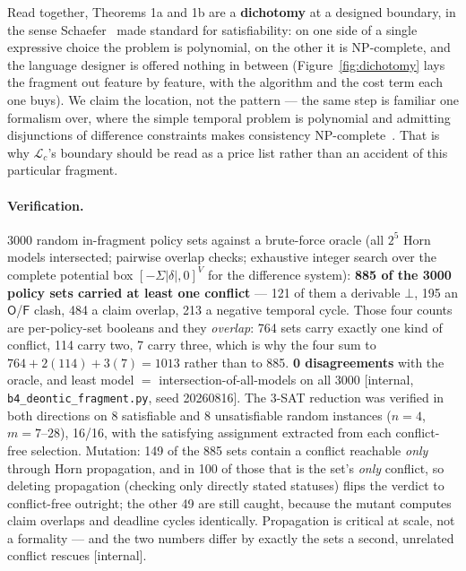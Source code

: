 \documentclass[11pt,a4paper]{article}
\newcommand{\Ob}{\mathsf{O}}
\newcommand{\Fb}{\mathsf{F}}
\begin{document}


Read together, Theorems 1a and 1b are a \textbf{dichotomy} at a designed boundary, in the sense Schaefer~\cite{schaefer78}
made standard for satisfiability: on one side of a single expressive choice the problem is polynomial, on the other it is
NP-complete, and the language designer is offered nothing in between (Figure~\ref{fig:dichotomy} lays the fragment out feature by
feature, with the algorithm and the cost term each one buys). We claim the location, not the pattern --- the same
step is familiar one formalism over, where the simple temporal problem is polynomial and admitting disjunctions of
difference constraints makes consistency NP-complete~\cite{dmp91,sk00}. That is why $\mathcal{L}_c$'s boundary should be read as a
price list rather than an accident of this particular fragment.

\paragraph{Verification.} 3000 random in-fragment policy sets against a brute-force oracle (all $2^5$ Horn models intersected;
pairwise overlap checks; exhaustive integer search over the complete potential box $[-\Sigma|\delta|,0]^V$ for the difference
system): \textbf{885 of the 3000 policy sets carried at least one conflict} --- 121 of them a derivable $\bot$, 195 an
$\Ob$/$\Fb$ clash, 484 a claim overlap, 213 a negative temporal cycle. Those four counts are per-policy-set booleans and they
\emph{overlap}: 764 sets carry exactly one kind of conflict, 114 carry two, 7 carry three, which is why the four sum to
$764+2(114)+3(7)=1013$ rather than to 885. \textbf{0 disagreements} with the oracle, and least model $=$
intersection-of-all-models on all 3000 [internal, \texttt{b4\_deontic\_fragment.py}, seed 20260816]. The 3-SAT reduction was
verified in both directions on 8 satisfiable and 8 unsatisfiable random instances ($n{=}4$, $m{=}7$--$28$), 16/16, with the
satisfying assignment extracted from each conflict-free selection. Mutation: 149 of the 885 sets contain a conflict reachable
\emph{only} through Horn propagation, and in 100 of those that is the set's \emph{only} conflict, so deleting propagation
(checking only directly stated statuses) flips the verdict to conflict-free outright; the other 49 are still caught, because
the mutant computes claim overlaps and deadline cycles identically. Propagation is critical at scale, not a formality ---
and the two numbers differ by exactly the sets a second, unrelated conflict rescues [internal].
\end{document}
